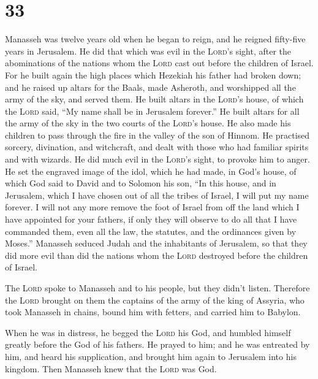 \hypertarget{section-32}{%
\section{33}\label{section-32}}

 Manasseh was twelve years old when he began to reign, and
he reigned fifty-five years in Jerusalem.  He did that
which was evil in the \textsc{Lord}'s sight, after the abominations of
the nations whom the \textsc{Lord} cast out before the children of
Israel.  For he built again the high places which Hezekiah
his father had broken down; and he raised up altars for the Baals, made
Asheroth, and worshipped all the army of the sky, and served them.
 He built altars in the \textsc{Lord}'s house, of which
the \textsc{Lord} said, ``My name shall be in Jerusalem forever.''
 He built altars for all the army of the sky in the two
courts of the \textsc{Lord}'s house.  He also made his
children to pass through the fire in the valley of the son of Hinnom. He
practised sorcery, divination, and witchcraft, and dealt with those who
had familiar spirits and with wizards. He did much evil in the
\textsc{Lord}'s sight, to provoke him to anger.  He set
the engraved image of the idol, which he had made, in God's house, of
which God said to David and to Solomon his son, ``In this house, and in
Jerusalem, which I have chosen out of all the tribes of Israel, I will
put my name forever.  I will not any more remove the foot
of Israel from off the land which I have appointed for your fathers, if
only they will observe to do all that I have commanded them, even all
the law, the statutes, and the ordinances given by Moses.''
 Manasseh seduced Judah and the inhabitants of Jerusalem,
so that they did more evil than did the nations whom the \textsc{Lord}
destroyed before the children of Israel.

 The \textsc{Lord} spoke to Manasseh and to his people,
but they didn't listen.  Therefore the \textsc{Lord}
brought on them the captains of the army of the king of Assyria, who
took Manasseh in chains, bound him with fetters, and carried him to
Babylon.

 When he was in distress, he begged the \textsc{Lord} his
God, and humbled himself greatly before the God of his fathers.
 He prayed to him; and he was entreated by him, and heard
his supplication, and brought him again to Jerusalem into his kingdom.
Then Manasseh knew that the \textsc{Lord} was God.

